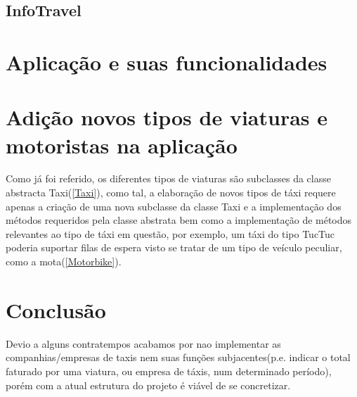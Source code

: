 \documentclass[a4paper,10pt,portuguese]{article}
\begin{document}
\subsection{InfoTravel}

\section{Aplicação e suas funcionalidades}

\section{Adição novos tipos de viaturas e motoristas na aplicação}
Como já foi referido, os diferentes tipos de viaturas são subclasses da classe abstracta Taxi(\ref{Taxi}), como tal, a elaboração de novos tipos de táxi requere apenas a criação de uma nova subclasse da classe Taxi e a implementação dos métodos requeridos pela classe abstrata bem como a implementação de métodos relevantes ao tipo de táxi em questão, por exemplo, um táxi do tipo TucTuc poderia suportar filas de espera visto se tratar de um tipo de veículo peculiar, como a mota(\ref{Motorbike}).

\newpage

\section{Conclusão}
Devio a alguns contratempos acabamos por nao implementar as companhias/empresas de taxis nem suas funções subjacentes(p.e. indicar o total faturado por uma viatura, ou empresa de táxis, num determinado período), porém com a atual estrutura do projeto é viável de se concretizar.
\end{document}
